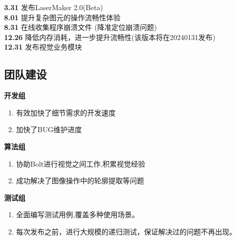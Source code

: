 \documentclass[AutoFakeBold,AutoFakeSlant]{beamer}
\begin{document}
	\begin{frame}[fragile]
		\large
		\linespread{1.6} \selectfont
		\textbf{3.31} {\large 发布LaserMaker 2.0(Beta)} \\
		\textbf{8.01} {\large 提升复杂图元的操作流畅性体验} \\
		\textbf{8.31} {\large 在线收集程序崩溃文件} ({\tiny 降准定位崩溃问题}) \\
		\textbf{12.26} {\large 降低内存消耗，进一步提升流畅性}({\tiny 该版本将在20240131发布}) \\
		\textbf{12.31} 发布视觉业务模块
	\end{frame}
	
	\subsection{团队建设}
	\begin{frame}[fragile]
		\large
		
		\begin{minipage}[l]{\linewidth}
			\footnotesize 
			\textbf{\large 开发组}\\
			\begin{enumerate}
				\item 有效加快了细节需求的开发速度
				\item 加快了BUG维护进度
			\end{enumerate}
		\end{minipage}
		
		\bigskip
		\bigskip
		
		\begin{minipage}[l]{0.5\linewidth}
			\footnotesize 
			\textbf{\large 算法组}\\
			\begin{enumerate}
				\item 协助Bolt进行视觉之间工作,积累视觉经验
				\item 成功解决了图像操作中的轮廓提取等问题
			\end{enumerate}
		\end{minipage}\hfill
		\begin{minipage}[l]{0.5\linewidth}
			\footnotesize 
			\textbf{\large 测试组}\\
			\begin{enumerate}
				\item 全面编写测试用例,覆盖多种使用场景。
				\item 每次发布之前，进行大规模的递归测试，保证解决过的问题不再出现。
			\end{enumerate}
		\end{minipage}
	\end{frame}
	
\end{document}
